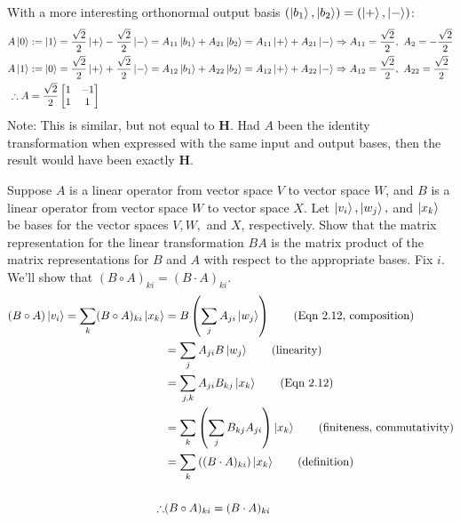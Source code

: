 With a more interesting orthonormal output basis $(\ket{b_1},\ket{b_2})=(\ket{+},\ket{-})$:
\begin{align*}
        A\ket{0} &:= \ket{1} = \frac{\sqrt{2}}{2}\ket{+}-\frac{\sqrt{2}}{2}\ket{-}= A_{11}\ket{b_1} + A_{21}\ket{b_2} = A_{11}\ket{+} + A_{21}\ket{-}\Rightarrow A_{11} = \frac{\sqrt{2}}{2},\ A_{2} = -\frac{\sqrt{2}}{2}\\
        A\ket{1} &:= \ket{0} = \frac{\sqrt{2}}{2}\ket{+}+\frac{\sqrt{2}}{2}\ket{-}= A_{12}\ket{b_1} + A_{22}\ket{b_2} = A_{12}\ket{+} + A_{22}\ket{-}\Rightarrow A_{12} = \frac{\sqrt{2}}{2},\ A_{22} = \frac{\sqrt{2}}{2}\\
    \therefore A &= \frac{\sqrt{2}}{2}
    \begin{bmatrix}
    1 & -1 \\
    1 & 1
    \end{bmatrix}
\end{align*}
Note: This is similar, but not equal to $\mathbf{H}$.  Had $A$ been the identity transformation when expressed with the
same input and output bases, then the result would have been exactly $\mathbf{H}$.

 Suppose $A$ is a linear operator from vector space $V$  to vector space $W$, and $B$ is a linear operator
from vector space $W$ to vector space $X$.  Let $\ket{v_i}, \ket{w_j},$ and $\ket{x_k}$ be bases for the vector spaces
$V, W,$ and $X$, respectively.  Show that the matrix representation for the linear transformation $BA$ is the matrix
product of the matrix representations for $B$ and $A$ with respect to the appropriate bases.
\Soln Fix $i$.  We'll show that $(B\circ A)_{ki} = (B \cdot A)_{ki}$.
\begin{align*}
(B\circ A) \ket{v_i} = \sum_k (B\circ A)_{ki} \ket{x_k} &= B \left( \sum_{j} A_{ji}\ket{w_j} \right) \tag{Eqn 2.12, composition}\\
	&= \sum_{j} A_{ji} B\ket{w_j}\tag{linearity}\\
	&= \sum_{j,k} A_{ji} B_{kj}\ket{x_k}\tag{Eqn 2.12}\\
	&= \sum_k \left( \sum_j B_{kj} A_{ji}  \right) \ket{x_k}\tag{finiteness, commutativity}\\
    &= \sum_k \left( (B\cdot A)_{ki}  \right) \ket{x_k}\tag{definition}\\\\
	\therefore & (B\circ A)_{ki} = (B\cdot A)_{ki}
\end{align*}



